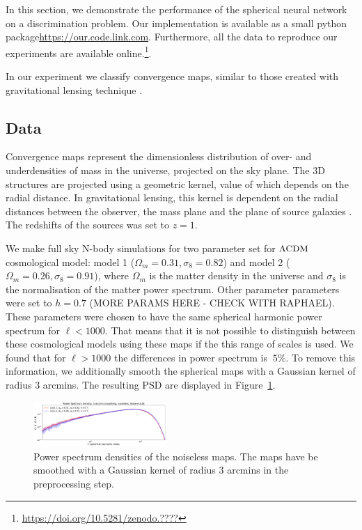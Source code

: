 \documentclass[final,twocolumn,3p,times,authoryear]{elsarticle}
\newcommand{\todo}[1]{{\color[rgb]{.6,.1,.6}{#1}}}
\newcommand{\figref}[1]{Figure~\ref{fig:#1}}
\newcommand{\1}{\b{1}}              %
\newcommand{\0}{\b{0}}              %
\begin{document}
In this section, we demonstrate the performance of the spherical neural network on a discrimination problem.
Our implementation is available as a small python package\url{https://our.code.link.com}.
Furthermore, all the data to reproduce our experiments are available online.\footnote{\url{https://doi.org/10.5281/zenodo.????} \todo{correct DOI}}.

In our experiment we classify convergence maps, similar to those created with gravitational lensing technique \citep{chang2017curvedsky}.

\subsection{Data}
\label{sec:data}

Convergence maps represent the dimensionless distribution of over- and underdensities of mass in the universe, projected on the sky plane.
The 3D structures are projected using a geometric kernel, value of which depends on the radial distance.
In gravitational lensing, this kernel is dependent on the radial distances between the observer, the mass plane and the plane of source galaxies \citep[see][for review of gravitational lensing]{bartelman2010gravitationallensing}.
The redshifts of the sources was set to $z=1$.

We make full sky N-body simulations for two parameter set for $\Lambda \rm{CDM} $ cosmological model: model 1 ($\Omega_m=0.31, \sigma_8=0.82$) and model 2 ($\Omega_m=0.26, \sigma_8=0.91$), where $\Omega_m$ is the matter density in the universe and $\sigma_8$ is the normalisation of the matter power spectrum.
Other parameter parameters were set to $h=0.7$ (MORE PARAMS HERE - CHECK WITH RAPHAEL).
These parameters were chosen to have the same spherical harmonic power spectrum for $\ell<1000$.
That means that it is not possible to distinguish between these cosmological models using these maps if the this range of scales is used.
We found that for $\ell>1000$ the differences in power spectrum is $~5\%$.
To remove this information, we additionally smooth the spherical maps with a Gaussian kernel of radius $3$ arcmins. The resulting PSD are displayed in \figref{psd_sigma3}.

\begin{figure}[!ht]
\centering
\includegraphics[width=0.45\textwidth]{figures/psd_sigma3.pdf}
\caption{Power spectrum densities of the noiseless maps. The maps have be smoothed with a Gaussian kernel of radius $3$ arcmins in the preprocessing step.}
\label{fig:psd_sigma3}
\end{figure}
\end{document}
